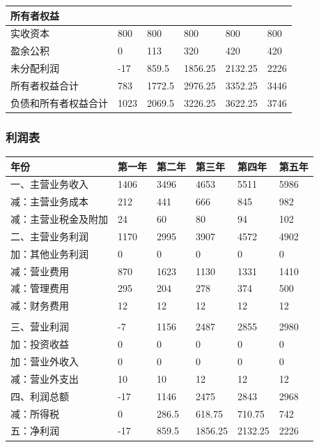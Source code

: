 \documentclass[master]{hduthesis}
\begin{document}
\begin{table}[H]
\begin{tabular}{|l|l|l|l|l|l|}
		所有者权益           &        &        &         &         &        \\ \hline
		实收资本             & 800    & 800    & 800     & 800     & 800    \\ \hline
		盈余公积             & 0      & 113    & 320     & 420     & 420    \\ \hline
		未分配利润           & -17    & 859.5  & 1856.25 & 2132.25 & 2226   \\ \hline
		所有者权益合计       & 783    & 1772.5 & 2976.25 & 3352.25 & 3446   \\ \hline

		负债和所有者权益合计 & 1023   & 2069.5 & 3226.25 & 3622.25 & 3746   \\ \hline
	\end{tabular}
\end{table}
\subsubsection{利润表}
\begin{table}[H]
	\centering
	\begin{tabular}{|l|l|l|l|l|l|}
		\hline
		年份                 & 第一年 & 第二年 & 第三年  & 第四年  & 第五年 \\ \hline
		一、主营业务收入     & 1406   & 3496   & 4653    & 5511    & 5986   \\ \hline
		减：主营业务成本     & 212    & 441    & 666     & 845     & 982    \\ \hline
		减：主营业税金及附加 & 24     & 60     & 80      & 94      & 102    \\ \hline
		二、主营业务利润     & 1170   & 2995   & 3907    & 4572    & 4902   \\ \hline
		加：其他业务利润     & 0      & 0      & 0       & 0       & 0      \\ \hline
		减：营业费用         & 870    & 1623   & 1130    & 1331    & 1410   \\ \hline
		减：管理费用         & 295    & 204    & 278     & 374     & 500    \\ \hline
		减：财务费用         & 12     & 12     & 12      & 12      & 12     \\ \hline
		                     &        &        &         &         &        \\ \hline
		三、营业利润         & -7     & 1156   & 2487    & 2855    & 2980   \\ \hline
		加：投资收益         & 0      & 0      & 0       & 0       & 0      \\ \hline
		加：营业外收入       & 0      & 0      & 0       & 0       & 0      \\ \hline
		减：营业外支出       & 10     & 10     & 12      & 12      & 12     \\ \hline
		四、利润总额         & -17    & 1146   & 2475    & 2843    & 2968   \\ \hline
		减：所得税           & 0      & 286.5  & 618.75  & 710.75  & 742    \\ \hline
		五：净利润           & -17    & 859.5  & 1856.25 & 2132.25 & 2226   \\ \hline
	\end{tabular}
\end{table}
\end{document}
